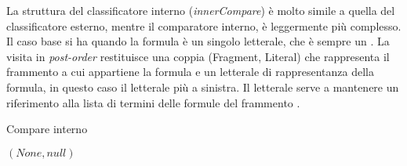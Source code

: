 \documentclass[./main.tex]{subfiles}
\begin{document}
La struttura del classificatore interno (\textit{innerCompare}) è molto simile a quella del classificatore esterno, mentre il comparatore interno,
è leggermente più complesso. 
Il caso base si ha quando la formula è un singolo letterale, che è sempre un \ob.
La visita in \textit{post-order} restituisce una coppia (Fragment, Literal) che rappresenta il frammento a cui appartiene la formula e un letterale
di rappresentanza della formula, in questo caso il letterale più a sinistra. 
Il letterale serve a mantenere un riferimento alla lista di termini delle formule del frammento \ob.

\begin{algorithm}[H] \label{alg:innerCompare}
    \caption{Compare interno}




    \Return $(None, null)$\;
\end{algorithm}
\end{document}
